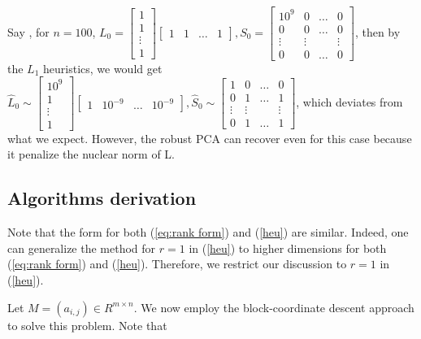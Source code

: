 Say , for $n=100$, $L_{0}=\left[\begin{array}{c}
1\\
1\\
\vdots \\
1
\end{array}\right]
[\begin{array}{cccc}
1 & 1 & \dots & 1
\end{array}],
S_{0} =
\left[ \begin{array}{cccc}
10^{9} & 0 & \dots & 0\\
0 & 0 & \dots & 0\\
\vdots & \vdots &  & \vdots\\
0 & 0 & \dots & 0
\end{array}\right]$,
then by the $L_{1}$ heuristics, we would get $\hat{L}_{0}\sim \left[ \begin{array}{c}
10^{9}\\
1\\
\vdots \\
1
\end{array} \right]
\left[\begin{array}{ccccc}
1 & 10^{-9} & \dots & 10^{-9}
\end{array}\right],
\hat{S}_{0} \sim
\left[\begin{array}{cccc}
1 & 0 & \dots & 0\\
0 & 1 & \dots & 1\\
\vdots & \vdots &  & \vdots \\
0 & 1 & \dots & 1
\end{array}\right]$, which deviates from what we expect. However, the robust PCA can recover even for this case because it penalize the nuclear norm of L.

\subsection{Algorithms derivation}

Note that the form for both (\ref{eq:rank form}) and (\ref{heu})
are similar. Indeed, one can generalize the method for $r=1$ in (\ref{heu})
to higher dimensions for both (\ref{eq:rank form}) and (\ref{heu}).
Therefore, we restrict our discussion to $r=1$ in (\ref{heu}).

Let $M=(a_{i,j})\in R^{m \times n}$. We now employ the block-coordinate
descent approach to solve this problem. Note that

